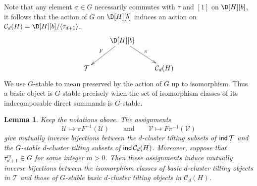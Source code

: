 \documentclass[12pt]{article}
\theoremstyle{plain}
\newtheorem{Lem}[Def]{Lemma}
\theoremstyle{definition}
\DeclareMathOperator{\ind}{\sf ind}
\newcommand{\Db}[1][]{\D[#1][b]}
\newcommand{\T}{\mathcal{T}}
\begin{document}
\medskip 
Note that any element $\sigma\in G$ necessarily commutes with $\tau$ and $[1]$ on $\Db[H]$, it follows that the action of $G$ on $\Db[H]$ induces an action on $\mathcal{C}_d(H)=\Db[H]/\langle\tau_{d+1}\rangle$. 
\[\xymatrix{
&\Db[H]\ar[ld]_{F}\ar[rd]^{\pi}\\
\T &&\mathcal{C}_d
(H)}\]
We use \(G\)-stable to mean preserved by the action of \(G\) up to
isomorphism.  Thus a basic object is \(G\)-stable precisely when the set of
isomorphism classes of its indecomposable direct summands is \(G\)-stable.
\begin{Lem}
\label{lem-dct-H-ctcat}
Keep the notations above. The assignments
\[
\mathcal U\longmapsto \pi F^{-1}(\mathcal U)
\qquad\text{and}\qquad
\mathcal V\longmapsto F\pi^{-1}(\mathcal V)
\]
give mutually inverse bijections between the $d$-cluster tilting subsets of
\(\ind\mathcal T\) and the $G$-stable $d$-cluster tilting subsets of
\(\ind\mathcal C_d(H)\).  Moreover, suppose that
\(\tau_{d+1}^m\in G\) for some integer \(m>0\).  Then these assignments
induce mutually inverse bijections between
the isomorphism classes of basic $d$-cluster tilting objects in
\(\mathcal T\) and those of $G$-stable basic $d$-cluster tilting objects in
\(\mathcal C_d(H)\).
\end{Lem} 
\end{document}
